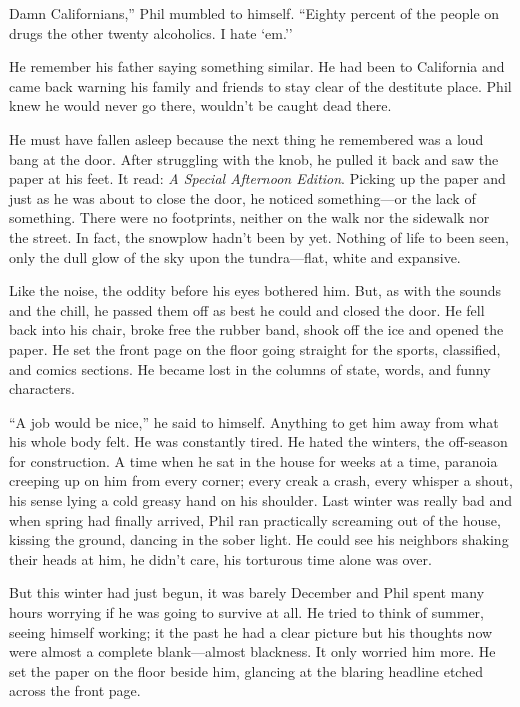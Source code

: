 Damn Californians,'' Phil mumbled to himself. ``Eighty percent of the
people on drugs the other twenty alcoholics. I hate `em.''

He remember his father saying something similar. He had been to
California and came back warning his family and friends to stay clear of
the destitute place. Phil knew he would never go there, wouldn't be
caught dead there.

He must have fallen asleep because the next thing he remembered was a
loud bang at the door. After struggling with the knob, he pulled it back
and saw the paper at his feet. It read: \emph{A Special Afternoon
Edition}. Picking up the paper and just as he was about to close the
door, he noticed something---or the lack of something. There were no
footprints, neither on the walk nor the sidewalk nor the street. In
fact, the snowplow hadn't been by yet. Nothing of life to been seen,
only the dull glow of the sky upon the tundra---flat, white and
expansive.

Like the noise, the oddity before his eyes bothered him. But, as with
the sounds and the chill, he passed them off as best he could and closed
the door. He fell back into his chair, broke free the rubber band, shook
off the ice and opened the paper. He set the front page on the floor
going straight for the sports, classified, and comics sections. He
became lost in the columns of state, words, and funny characters.

``A job would be nice,'' he said to himself. Anything to get him away
from what his whole body felt. He was constantly tired. He hated the
winters, the off-season for construction. A time when he sat in the
house for weeks at a time, paranoia creeping up on him from every
corner; every creak a crash, every whisper a shout, his sense lying a
cold greasy hand on his shoulder. Last winter was really bad and when
spring had finally arrived, Phil ran practically screaming out of the
house, kissing the ground, dancing in the sober light. He could see his
neighbors shaking their heads at him, he didn't care, his torturous time
alone was over.

But this winter had just begun, it was barely December and Phil spent
many hours worrying if he was going to survive at all. He tried to think
of summer, seeing himself working; it the past he had a clear picture
but his thoughts now were almost a complete blank---almost blackness. It
only worried him more. He set the paper on the floor beside him,
glancing at the blaring headline etched across the front page.

